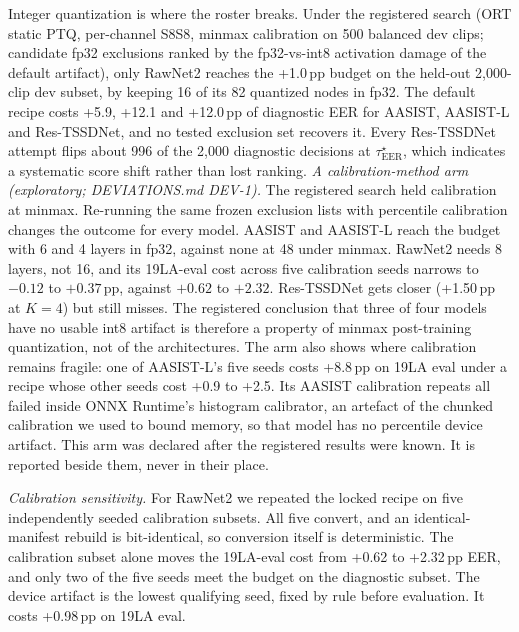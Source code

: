 \documentclass[journal]{IEEEtran}
\newcommand{\eer}{\mathrm{EER}}
\newcommand{\taustar}{\tau^{\star}}
\begin{document}
Integer quantization is where the roster breaks. Under the registered search
(ORT static PTQ, per-channel S8S8, minmax calibration on 500 balanced dev
clips; candidate fp32 exclusions ranked by the fp32-vs-int8 activation damage
of the default artifact), only RawNet2 reaches the +1.0\,pp budget on the
held-out 2,000-clip dev subset, by keeping 16 of its 82 quantized nodes in
fp32. The default recipe costs +5.9, +12.1 and +12.0\,pp of diagnostic EER for
AASIST, AASIST-L and Res-TSSDNet, and no tested exclusion set recovers it.
Every Res-TSSDNet attempt flips about 996 of the 2,000 diagnostic decisions
at \(\taustar_{\eer}\), which indicates a systematic score shift rather than
lost ranking. \emph{A calibration-method arm (exploratory; DEVIATIONS.md DEV-1).} The
registered search held calibration at minmax. Re-running the same frozen
exclusion lists with percentile calibration changes the outcome for every
model. AASIST and AASIST-L reach the budget with 6 and 4 layers in fp32, against
none at 48 under minmax. RawNet2 needs 8 layers, not 16, and its 19LA-eval cost
across five calibration seeds narrows to \(-0.12\) to \(+0.37\)\,pp, against
\(+0.62\) to \(+2.32\). Res-TSSDNet gets closer (+1.50\,pp at \(K{=}4\)) but still
misses. The registered conclusion that three of four models have no usable int8
artifact is therefore a property of minmax post-training quantization, not of
the architectures. The arm also shows where calibration remains fragile: one
of AASIST-L's five seeds costs +8.8\,pp on 19LA eval under a recipe whose other
seeds cost +0.9 to +2.5. Its AASIST calibration repeats all failed inside ONNX
Runtime's histogram calibrator, an artefact of the chunked calibration we used
to bound memory, so that model has no percentile device artifact. This arm was
declared after the registered results were known. It is reported beside them,
never in their place.

\emph{Calibration sensitivity.} For RawNet2 we repeated the locked recipe on
five independently seeded calibration subsets. All five convert, and an
identical-manifest rebuild is bit-identical, so conversion itself is
deterministic. The calibration subset alone moves the 19LA-eval cost from
+0.62 to +2.32\,pp EER, and only two of the five seeds meet the budget on the
diagnostic subset. The device artifact is the lowest qualifying seed, fixed
by rule before evaluation. It costs +0.98\,pp on 19LA eval.
\end{document}
